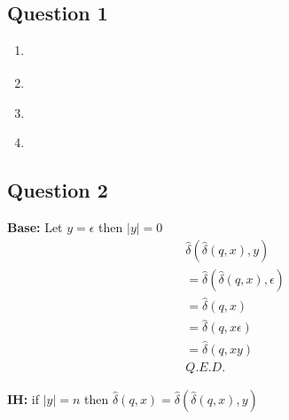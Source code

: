 \documentclass[12pt,a4paper]{article}
\begin{document}
	
	\subsection*{Question 1}
	\begin{enumerate}
		\item
			\begin{center}
			\end{center}
		\item  ~\\		
			\begin{center}
			\end{center}
		
		\begingroup{}
		\item  	~\\ 
		\begin{center}
		\end{center}
		\item  ~\\		
		\begin{center}
		\end{center}
		\endgroup
	\end{enumerate}

	\subsection*{Question 2}
		\noindent
		\textbf{Base:} Let $ y=\epsilon $ then $ |y|=0$
		\begin{align*}
			&\hat{\delta}(\hat{\delta}(q,x),y)		\tag{assumption}
			\\ &=\hat{\delta}(\hat{\delta}(q,x),\epsilon)	\tag{definition}
			\\ &=\hat{\delta}(q,x)					\tag{definition}
			\\ &=\hat{\delta}(q,x\epsilon)			\tag{definition}
			\\ &=\hat{\delta}(q,xy) 				\tag{assumption}
			\\ &Q.E.D.
		\end{align*}
		
		\noindent
		\textbf{IH:} if $|y|=n$ then $\hat{\delta}(q,x)=\hat{\delta}(\hat{\delta}(q,x),y)$\\
		
\end{document}
